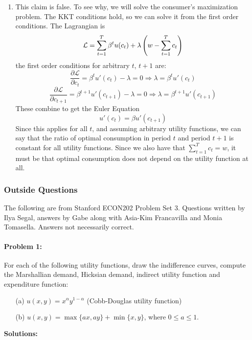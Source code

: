 \documentclass[12pt]{article}
\begin{document}
\begin{enumerate}
\begin{enumerate}
		\item This claim is false. To see why, we will solve the consumer's maximization problem. The KKT conditions hold, so we can solve it from the first order conditions. The Lagrangian is
		\[
		\mathcal{L} = \sum_{t=1}^T \beta^t u(c_t) + \lambda \left( w - \sum_{t=1}^T c_t\right) 
		\]
		the first order conditions for arbitrary $t$, $t+1$ are:
		\[
		\frac{\partial \mathcal{L}}{\partial c_t} = \beta^t u'(c_t) - \lambda  = 0 \Longrightarrow \lambda = \beta^t u'(c_t)
		\]
		\[
		\frac{\partial \mathcal{L}}{\partial c_{t+1}} = \beta^{t+1} u'(c_{t+1}) - \lambda = 0 \Longrightarrow \lambda = \beta^{t+1} u'(c_{t+1})
		\]
		These combine to get the Euler Equation
		\[
		u'(c_t) = \beta u'(c_{t+1})
		\]
		Since this applies for all $t$, and assuming arbitrary utility functions, we can say that the ratio of optimal consumption in period $t$ and period $t+1$ is constant for all utility functions. Since we also have that $\sum_{t=1}^T c_t = w$, it must be that optimal consumption does not depend on the utility function at all.
	\end{enumerate}
\end{enumerate}

\subsubsection{Outside Questions}

The following are from Stanford ECON202 Problem Set 3. Questions written by Ilya Segal, answers by Gabe along with Asia-Kim Francavilla and Monia Tomasella. Answers not necessarily correct.

\paragraph{Problem 1:} For each of the following utility functions, draw the indifference curves, compute the Marshallian demand, Hicksian demand, indirect utility function and expenditure function:
\begin{itemize}
    \item[(a)] $u(x,y) = x^\alpha y^{1-\alpha}$ (Cobb-Douglas utility function)

    \item[(b)] $u(x,y) = \max\{a x,ay\} + \min\{x,y\} $, where $0 \le a \le 1$.
\end{itemize}

\medskip

\textbf{Solutions:}
\end{document}
